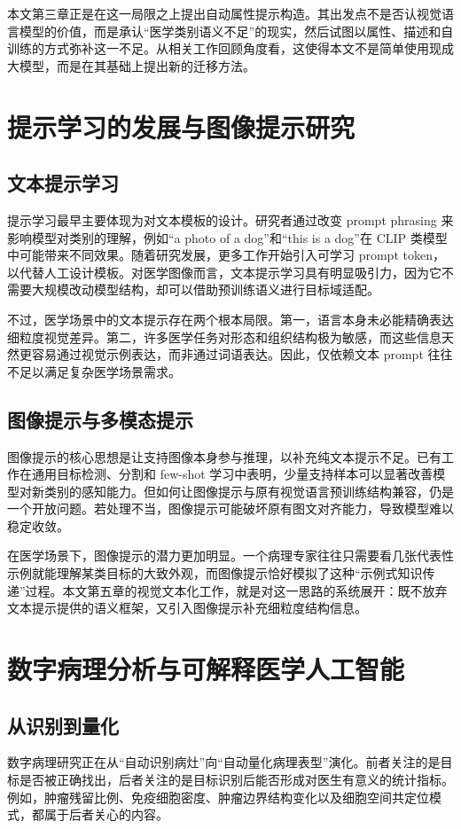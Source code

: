 本文第三章正是在这一局限之上提出自动属性提示构造。其出发点不是否认视觉语言模型的价值，而是承认“医学类别语义不足”的现实，然后试图以属性、描述和自训练的方式弥补这一不足。从相关工作回顾角度看，这使得本文不是简单使用现成大模型，而是在其基础上提出新的迁移方法。

\section{提示学习的发展与图像提示研究}

\subsection{文本提示学习}
提示学习最早主要体现为对文本模板的设计。研究者通过改变 prompt phrasing 来影响模型对类别的理解，例如“a photo of a dog”和“this is a dog”在 CLIP 类模型中可能带来不同效果。随着研究发展，更多工作开始引入可学习 prompt token，以代替人工设计模板。对医学图像而言，文本提示学习具有明显吸引力，因为它不需要大规模改动模型结构，却可以借助预训练语义进行目标域适配。

不过，医学场景中的文本提示存在两个根本局限。第一，语言本身未必能精确表达细粒度视觉差异。第二，许多医学任务对形态和组织结构极为敏感，而这些信息天然更容易通过视觉示例表达，而非通过词语表达。因此，仅依赖文本 prompt 往往不足以满足复杂医学场景需求。

\subsection{图像提示与多模态提示}
图像提示的核心思想是让支持图像本身参与推理，以补充纯文本提示不足。已有工作在通用目标检测、分割和 few-shot 学习中表明，少量支持样本可以显著改善模型对新类别的感知能力。但如何让图像提示与原有视觉语言预训练结构兼容，仍是一个开放问题。若处理不当，图像提示可能破坏原有图文对齐能力，导致模型难以稳定收敛。

在医学场景下，图像提示的潜力更加明显。一个病理专家往往只需要看几张代表性示例就能理解某类目标的大致外观，而图像提示恰好模拟了这种“示例式知识传递”过程。本文第五章的视觉文本化工作，就是对这一思路的系统展开：既不放弃文本提示提供的语义框架，又引入图像提示补充细粒度结构信息。

\section{数字病理分析与可解释医学人工智能}

\subsection{从识别到量化}
数字病理研究正在从“自动识别病灶”向“自动量化病理表型”演化。前者关注的是目标是否被正确找出，后者关注的是目标识别后能否形成对医生有意义的统计指标。例如，肿瘤残留比例、免疫细胞密度、肿瘤边界结构变化以及细胞空间共定位模式，都属于后者关心的内容。

